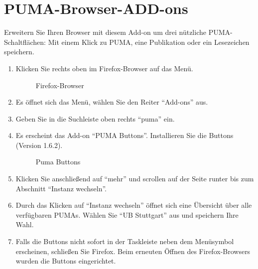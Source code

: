 \section{PUMA-Browser-ADD-ons}
Erweitern Sie Ihren Browser mit diesem Add-on um drei nützliche PUMA-Schaltflächen: Mit einem Klick zu PUMA, eine Publikation oder ein Lesezeichen speichern.\newline
\begin{enumerate}
\item Klicken Sie rechts oben im Firefox-Browser auf das Menü.
\begin{figure}[h!]
 \centering
 \caption{Firefox-Browser}
 \label{figure021}
\end{figure} 
\item Es öffnet sich das Menü, wählen Sie den Reiter \enquote{Add-ons} aus. 
\item Geben Sie in die Suchleiste oben rechts \enquote{puma} ein.
\item Es erscheint das Add-on \enquote{PUMA Buttons}. Installieren Sie die Buttons (Version 1.6.2).
\begin{figure}[h!]
 \centering
 \caption{Puma Buttons}
 \label{figure022}
\end{figure} 
\item Klicken Sie anschließend auf \enquote{mehr} und scrollen auf der Seite runter bis zum Abschnitt \enquote{Instanz wechseln}. 
\item Durch das Klicken auf \enquote{Instanz wechseln} öffnet sich eine Übersicht über alle verfügbaren PUMAs. Wählen Sie  \enquote{UB Stuttgart} aus und speichern Ihre Wahl.
\item Falls die Buttons nicht sofort in der Taskleiste neben dem Menüsymbol  erscheinen, schließen Sie Firefox. Beim erneuten Öffnen des Firefox-Browsers wurden die Buttons eingerichtet.
\end{enumerate}
